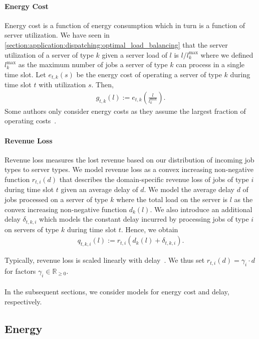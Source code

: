 \paragraph{Energy Cost} Energy cost is a function of energy consumption which in turn is a function of server utilization. We have seen in \cref{section:application:dispatching:optimal_load_balancing} that the server utilization of a server of type $k$ given a server load of $l$ is $l / l_k^{\text{max}}$ where we defined $l_k^{\text{max}}$ as the maximum number of jobs a server of type $k$ can process in a single time slot. Let $e_{t,k}(s)$ be the energy cost of operating a server of type $k$ during time slot $t$ with utilization $s$. Then, \begin{align*}
    g_{t,k}(l) := e_{t,k}\left(\frac{l}{l_k^{\text{max}}}\right).
\end{align*} Some authors only consider energy costs as they assume the largest fraction of operating costs~\cite{Bansal2015}.

\paragraph{Revenue Loss} Revenue loss measures the lost revenue based on our distribution of incoming job types to server types. We model revenue loss as a convex increasing non-negative function $r_{t,i}(d)$ that describes the domain-specific revenue loss of jobs of type $i$ during time slot $t$ given an average delay of $d$. We model the average delay $d$ of jobs processed on a server of type $k$ where the total load on the server is $l$ as the convex increasing non-negative function $d_{k}(l)$. We also introduce an additional delay $\delta_{t,k,i}$ which models the constant delay incurred by processing jobs of type $i$ on servers of type $k$ during time slot $t$. Hence, we obtain \begin{align*}
    q_{t,k,i}(l) := r_{t,i}(d_{k}(l) + \delta_{t,k,i}).
\end{align*}

Typically, revenue loss is scaled linearly with delay~\cite{Lin2011}. We thus set $r_{t,i}(d) = \gamma_i \cdot d$ for factors $\gamma_i \in \mathbb{R}_{\geq 0}$.

\paragraph{} In the subsequent sections, we consider models for energy cost and delay, respectively.

\subsection{Energy}\label{section:application:operating_cost:energy}

